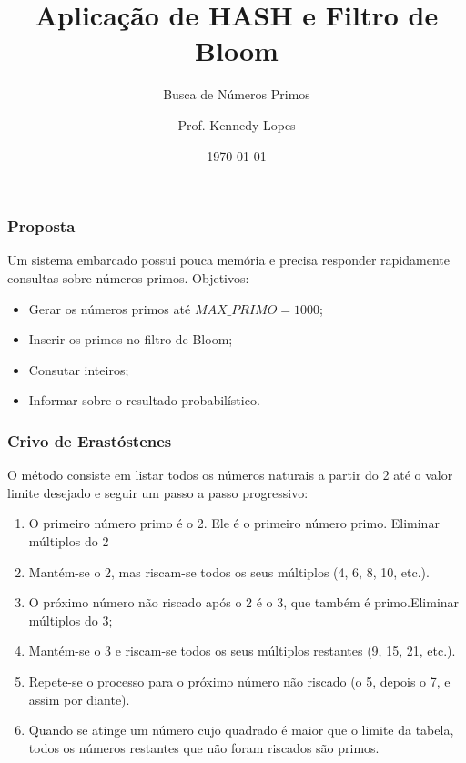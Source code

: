 \documentclass[t, handout, xcolor=table, aspectratio=169]{beamer}
\title{Aplicação de HASH e Filtro de Bloom}
\subtitle{Busca de Números Primos}
\institute{UFERSA}
\author{Prof. Kennedy Lopes}
\date{\today}
\begin{document}
\begin{frame}
  \titlepage
\end{frame}

\newcommand{\addsection}[2]{\section{#1}}
\newcommand{\addsubsection}[2]{\subsection{#1}}

\begin{frame}
  \frametitle{Proposta}
  Um sistema embarcado possui pouca memória e precisa responder rapidamente consultas sobre números primos.
  Objetivos:
  \begin{itemize}
    \item Gerar os números primos até \texttt{$MAX\_PRIMO=1000$};
    \item Inserir os primos no filtro de Bloom;
    \item Consutar inteiros;
    \item Informar sobre o resultado probabilístico.
  \end{itemize}
\end{frame}

\begin{frame}
  \frametitle{Crivo de Erastóstenes}

  O método consiste em listar todos os números naturais a partir do 2 até o valor limite desejado e seguir um passo a passo progressivo:
  \begin{enumerate}
    \item O primeiro número primo é o 2. Ele é o primeiro número primo. Eliminar múltiplos do 2
    \item Mantém-se o 2, mas riscam-se todos os seus múltiplos (4, 6, 8, 10, etc.).
    \item O próximo número não riscado após o 2 é o 3, que também é primo.Eliminar múltiplos do 3;
    \item Mantém-se o 3 e riscam-se todos os seus múltiplos restantes (9, 15, 21, etc.).
    \item Repete-se o processo para o próximo número não riscado (o 5, depois o 7, e assim por diante).
    \item Quando se atinge um número cujo quadrado é maior que o limite da tabela, todos os números restantes que não foram riscados são primos.
  \end{enumerate}

\end{frame}
\end{document}
